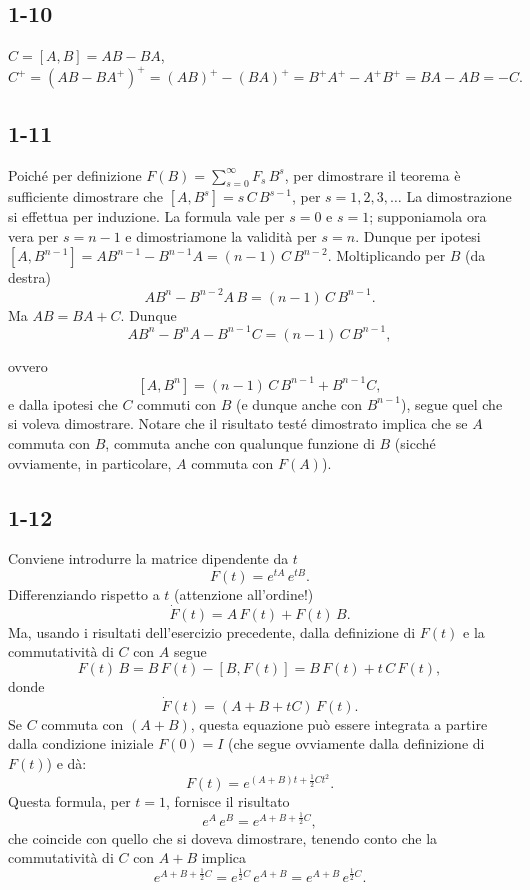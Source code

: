 \documentclass[11pt, a4paper]{book}
\numberwithin{equation}{section}
\begin{document}
\subsection*{1-10}
$C = [A,B] = AB - BA$,
\[
C^+ = (AB-BA^+)^+ = (AB)^+ - (BA)^+ = B^+A^+ - A^+B^+ = BA - AB = -C.
\]

\subsection*{1-11}
Poiché per definizione $F(B) = \sum_{s=0}^{\infty} F_s\,B^s$, per
dimostrare il teorema è sufficiente dimostrare che $[A, B^s] = s\,C\,B^{s-1}$,
per $s = 1, 2, 3, \ldots$ La dimostrazione si effettua per induzione. La
formula vale per $s=0$ e $s=1$; supponiamola ora vera per $s=n-1$ e
dimostriamone la validità per $s=n$. Dunque per ipotesi
$[A, B^{n-1}] = AB^{n-1} - B^{n-1}A = (n-1)\,C\,B^{n-2}$.
Moltiplicando per $B$ (da destra)
\[
AB^n - B^{n-2}A\,B = (n-1)\,C\,B^{n-1}.
\]
Ma $AB = BA + C$. Dunque
\[
AB^n - B^n A - B^{n-1}C = (n-1)\,C\,B^{n-1},
\]


ovvero
\[
[A, B^n] = (n-1)\,C\,B^{n-1} + B^{n-1}C,
\]
e dalla ipotesi che $C$ commuti con $B$ (e dunque anche con $B^{n-1}$),
segue quel che si voleva dimostrare. Notare che il risultato testé
dimostrato implica che se $A$ commuta con $B$, commuta anche con qualunque
funzione di $B$ (sicché ovviamente, in particolare, $A$ commuta con
$F(A)$).

\subsection*{1-12}
Conviene introdurre la matrice dipendente da $t$
\[
F(t) = e^{tA}\,e^{tB}.
\]
Differenziando rispetto a $t$ (attenzione all'ordine!)
\[
\dot{F}(t) = A\,F(t) + F(t)\,B.
\]
Ma, usando i risultati dell'esercizio precedente, dalla definizione di
$F(t)$ e la commutatività di $C$ con $A$ segue
\[
F(t)\,B = B\,F(t) - [B, F(t)] = B\,F(t) + t\,C\,F(t),
\]
donde
\[
\dot{F}(t) = (A+B+tC)\,F(t).
\]
Se $C$ commuta con $(A+B)$, questa equazione può essere integrata a
partire dalla condizione iniziale $F(0)=I$ (che segue ovviamente dalla
definizione di $F(t)$) e dà:
\[
F(t) = e^{(A+B)t + \frac{1}{2}Ct^2}.
\]
Questa formula, per $t=1$, fornisce il risultato
\[
e^A\,e^B = e^{A+B+\frac{1}{2}C},
\]
che coincide con quello che si doveva dimostrare, tenendo conto che la
commutatività di $C$ con $A+B$ implica
\[
e^{A+B+\frac{1}{2}C} = e^{\frac{1}{2}C}\,e^{A+B}
= e^{A+B}\,e^{\frac{1}{2}C}.
\]
\end{document}
